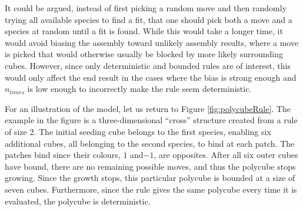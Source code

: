 It could be argued, instead of first picking a random move and then randomly trying all available species to find a fit, that one should pick both a move and a species at random until a fit is found. While this would take a longer time, it would avoid biasing the assembly toward unlikely assembly results, where a move is picked that would otherwise usually be blocked by more likely surrounding cubes. However, since only deterministic and bounded rules are of interest, this would only affect the end result in the cases where the bias is strong enough and \(n_{times}\) is low enough to incorrectly make the rule seem deterministic.


For an illustration of the model, let us return to Figure \ref{fig:polycubeRule}. The example in the figure is a three-dimensional ``cross'' structure created from a rule of size 2. The initial seeding cube belongs to the first species, enabling six additional cubes, all belonging to the second species, to bind at each patch. The patches bind since their colours, \(1\) and\( -1\), are opposites. After all six outer cubes have bound, there are no remaining possible moves, and thus the polycube stops growing. Since the growth stops, this particular polycube is bounded at a size of seven cubes. Furthermore, since the rule gives the same polycube every time it is evaluated, the polycube is deterministic.

